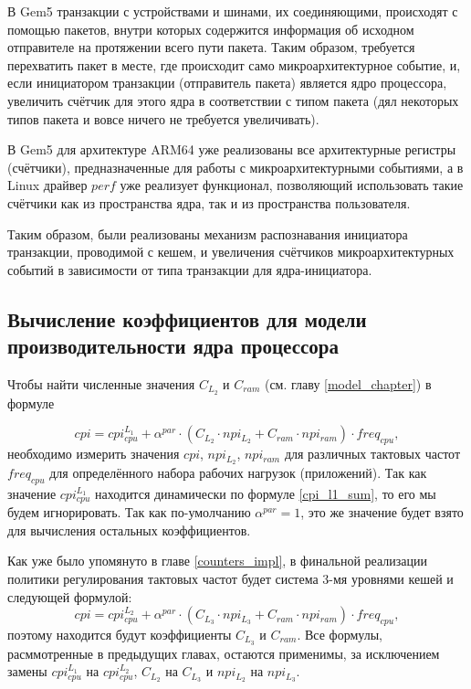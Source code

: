     В Gem5 транзакции с устройствами и шинами, их соединяющими, происходят с помощью пакетов,
    внутри которых содержится информация об исходном отправителе на протяжении всего пути
    пакета. Таким образом, требуется перехватить пакет в месте, где происходит само микроархитектурное
    событие, и, если инициатором транзакции (отправитель пакета) является ядро процессора,
    увеличить счётчик для этого ядра в соответствии с типом пакета (дял некоторых типов пакета и вовсе
    ничего не требуется увеличивать).

    В Gem5 для архитектуре ARM64 уже реализованы все архитектурные регистры (счётчики), предназначенные
    для работы с микроархитектурными событиями, а в Linux драйвер $perf$ уже реализует функционал,
    позволяющий использовать такие счётчики как из пространства ядра, так и из пространства пользователя.

    Таким образом, были реализованы механизм распознавания инициатора транзакции, проводимой
    с кешем, и увеличения счётчиков микроархитектурных событий в зависимости от типа транзакции
    для ядра-инициатора.

\subsection{Вычисление коэффициентов для модели производительности ядра процессора} \label{model_coeffs}

    Чтобы найти численные значения $C_{L_2}$ и $C_{ram}$ (см. главу \ref{model_chapter}) в формуле

    \begin{equation*}
        cpi = cpi_{cpu}^{L_1} + \alpha^{par} \cdot
        \left( C_{L_2} \cdot npi_{L_2} + C_{ram} \cdot npi_{ram} \right) \cdot freq_{cpu},
    \end{equation*}
    необходимо измерить значения $cpi$, $npi_{L_2}$, $npi_{ram}$ для различных тактовых частот
    $freq_{cpu}$ для определённого набора рабочих нагрузок (приложений). Так как значение $cpi_{cpu}^{L_1}$
    находится динамически по формуле \eqref{cpi_l1_sum}, то его мы будем игнорировать. Так как
    по-умолчанию $\alpha^{par} = 1$, это же значение будет взято для вычисления остальных коэффициентов.

    Как уже было упомянуто в главе \ref{counters_impl}, в финальной реализации политики регулирования тактовых
    частот будет система 3-мя уровнями кешей и следующей формулой:
    \begin{equation} \label{cpi_formula_3lvl}
        cpi = cpi_{cpu}^{L_2} + \alpha^{par} \cdot
        \left( C_{L_3} \cdot npi_{L_3} + C_{ram} \cdot npi_{ram} \right) \cdot freq_{cpu},
    \end{equation}
    поэтому находится будут коэффициенты $C_{L_3}$ и $C_{ram}$. Все формулы, расммотренные в предыдущих
    главах, остаются применимы, за исключением замены $cpi_{cpu}^{L_1}$ на $cpi_{cpu}^{L_2}$,
    $C_{L_2}$ на $C_{L_3}$ и $npi_{L_2}$ на $npi_{L_3}$.

